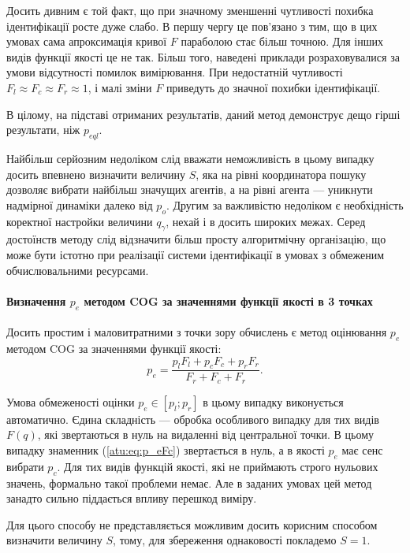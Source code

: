 Досить дивним є той факт, що при значному зменшенні чутливості похибка
ідентифікації росте дуже слабо. В першу чергу це пов'язано з тим, що в цих
умовах сама апроксимація кривої $F$ параболою стає більш точною. Для інших
видів функції якості це не так. Більш того, наведені приклади розраховувалися
за умови відсутності помилок вимірювання. При недостатній чутливості
$F_l \approx F_c \approx F_r \approx 1$, і малі зміни $F$ приведуть до значної
похибки ідентифікації.

В цілому, на підставі отриманих результатів, даний метод демонструє дещо
гірші результати, ніж $p_{eql}$.

Найбільш серйозним недоліком слід вважати неможливість в цьому
випадку досить впевнено визначити величину
$S$, яка на рівні координатора пошуку дозволяє вибрати найбільш
значущих агентів, а на рівні агента --- уникнути надмірної
динаміки далеко від
$ p_o $. Другим за важливістю недоліком є необхідність коректної
настройки величини
$ q_\gamma $, нехай і в досить широких межах. Серед достоїнств методу
слід відзначити більш просту алгоритмічну організацію, що може
бути істотно при реалізації системи ідентифікації в умовах з
обмеженим обчислювальними ресурсами.



\paragraph{Визначення $ p_e $ методом COG за значеннями функції якості в 3 точках}

Досить простим і маловитратними з точки зору обчислень є метод оцінювання $p_e$ методом
COG за значеннями функції якості:
%
\begin{equation}
  p_e =
  \frac{p_l F_l + p_c F_c + p_r F_r}{ F_r + F_c + F_r}  .
  \label{atu:eq:p_eFc}
\end{equation}

Умова обмеженості оцінки $p_e \in [p_l; p_r]$ в цьому випадку виконується
автоматично.
Єдина складність --- обробка особливого випадку для тих видів
$F(q) $, які звертаються в нуль на видаленні від центральної
точки. В цьому випадку знаменник (\ref{atu:eq:p_eFc}) звертається в нуль,
а в якості $ p_e $ має сенс вибрати $ p_c $.
Для тих видів функцій якості, які не приймають строго
нульових значень, формально такої проблеми немає.
Але в заданих умовах цей метод занадто
сильно піддається впливу перешкод виміру.

Для цього способу не представляється можливим досить корисним
способом визначити величину
$ S $, тому, для збереження однаковості покладемо
$ S = 1 $.

